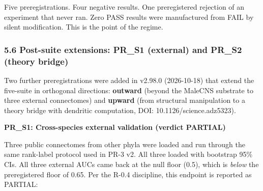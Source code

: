 \documentclass[
]{article}
\begin{document}
Five preregistrations. Four negative results. One preregistered
rejection of an experiment that never ran. Zero PASS results were
manufactured from FAIL by silent modification. This is the point of the
regime.

\subsubsection{5.6 Post-suite extensions: PR\_S1 (external) and PR\_S2
(theory
bridge)}\label{post-suite-extensions-pr_s1-external-and-pr_s2-theory-bridge}

Two further preregistrations were added in v2.98.0 (2026-10-18) that
extend the five-suite in orthogonal directions: \textbf{outward} (beyond
the MaleCNS substrate to three external connectomes) and \textbf{upward}
(from structural manipulation to a theory bridge with \citet{ref07}
dendritic computation, DOI: 10.1126/science.adz5323).

\textbf{PR\_S1: Cross-species external validation (verdict PARTIAL)}

Three public connectomes from other phyla were loaded and run through
the same rank-label protocol used in PR-3 v2. All three loaded with
bootstrap 95\% CIs. All three external AUCs came back at the null floor
(0.5), which is \emph{below} the preregistered floor of 0.65. Per the
R-0.4 discipline, this endpoint is reported as PARTIAL:
\end{document}
